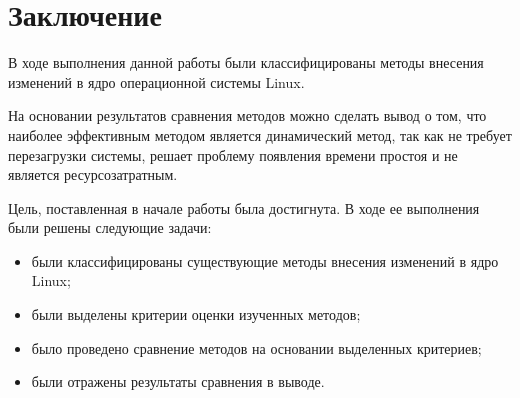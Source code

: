 \chapter*{Заключение}

В ходе выполнения данной работы были классифицированы методы внесения изменений в ядро операционной системы Linux. 

На основании результатов сравнения методов можно сделать вывод о том, что наиболее эффективным методом является динамический метод, так как не требует перезагрузки системы, решает проблему появления времени простоя и не является ресурсозатратным.

Цель, поставленная в начале работы была достигнута. В ходе ее выполнения были решены следующие задачи:

\begin{itemize}
	\item были классифицированы существующие методы внесения изменений в ядро Linux;
	\item были выделены критерии оценки изученных методов;
	\item было проведено сравнение методов на основании выделенных критериев;
	\item были отражены результаты сравнения в выводе.
\end{itemize}